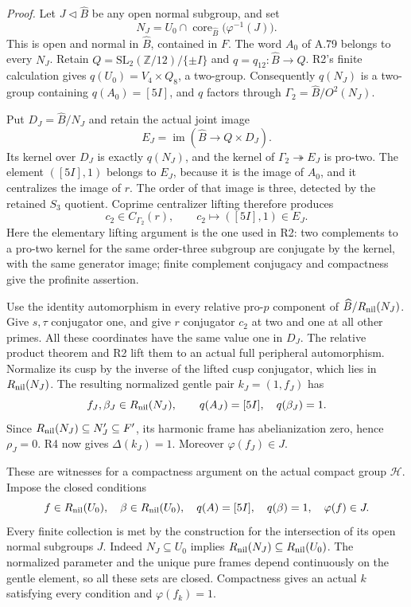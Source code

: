 \emph{Proof.}
Let $J\triangleleft\widehat B$ be any open normal subgroup, and set
\[
 N_J=U_0\cap\operatorname{core}_{\widehat B}
                              \bigl(\varphi^{-1}(J)\bigr).
\]
This is open and normal in $\widehat B$, contained in $F$.
The word $A_0$ of A.79 belongs to every $N_J$.
Retain $Q=\mathrm{SL}_2(\mathbb Z/12)/\{\pm I\}$ and
$q=q_{12}:\widehat B\to Q$. R2's finite calculation gives
$q(U_0)=V_4\times Q_8$, a two-group. Consequently $q(N_J)$
is a two-group containing $q(A_0)=[5I]$, and $q$ factors through
$\Gamma_2=\widehat B/O^2(N_J)$.

Put $D_J=\widehat B/N_J$ and retain the actual joint image
\[
 E_J=\operatorname{im}(\widehat B\to Q\times D_J).
\]
Its kernel over $D_J$ is exactly $q(N_J)$, and the kernel of
$\Gamma_2\twoheadrightarrow E_J$ is pro-two. The element
$([5I],1)$ belongs to $E_J$, because it is the image of $A_0$,
and it centralizes the image of $r$. The order of that image is
three, detected by the retained $S_3$ quotient. Coprime
centralizer lifting therefore produces
\[
 c_2\in C_{\Gamma_2}(r),\qquad
 c_2\longmapsto([5I],1)\in E_J.
\]
Here the elementary lifting argument is the one used in R2:
two complements to a pro-two kernel for the same order-three
subgroup are conjugate by the kernel, with the same generator
image; finite complement conjugacy and compactness give the
profinite assertion.

Use the identity automorphism in every relative pro-$p$ component
of $\widehat B/R_{\rm nil}(N_J)$. Give $s,\tau$ conjugator one,
and give $r$ conjugator $c_2$ at two and one at all other primes.
All these coordinates have the same value one in $D_J$.
The relative product theorem and R2 lift them to an actual full
peripheral automorphism. Normalize its cusp by the inverse of
the lifted cusp conjugator, which lies in $R_{\rm nil}(N_J)$.
The resulting normalized gentle pair $k_J=(1,f_J)$ has
\[
 f_J,\beta_J\in R_{\rm nil}(N_J),\qquad
 q(A_J)=[5I],\quad q(\beta_J)=1.
\]
Since $R_{\rm nil}(N_J)\subseteq N_J'\subseteq F'$, its
harmonic frame has abelianization zero, hence $\rho_J=0$.
R4 now gives $\Delta(k_J)=1$. Moreover
$\varphi(f_J)\in J$.

These are witnesses for a compactness argument on the actual
compact group $\mathcal H$. Impose the closed conditions
\[
 f\in R_{\rm nil}(U_0),\quad\beta\in R_{\rm nil}(U_0),
 \quad q(A)=[5I],\quad q(\beta)=1,
 \quad\varphi(f)\in J.
\]
Every finite collection is met by the construction for the
intersection of its open normal subgroups $J$.
Indeed $N_J\subseteq U_0$ implies
$R_{\rm nil}(N_J)\subseteq R_{\rm nil}(U_0)$.
The normalized parameter and the unique pure frames depend
continuously on the gentle element, so all these sets are closed.
Compactness gives an actual $k$ satisfying every condition and
$\varphi(f_k)=1$.

